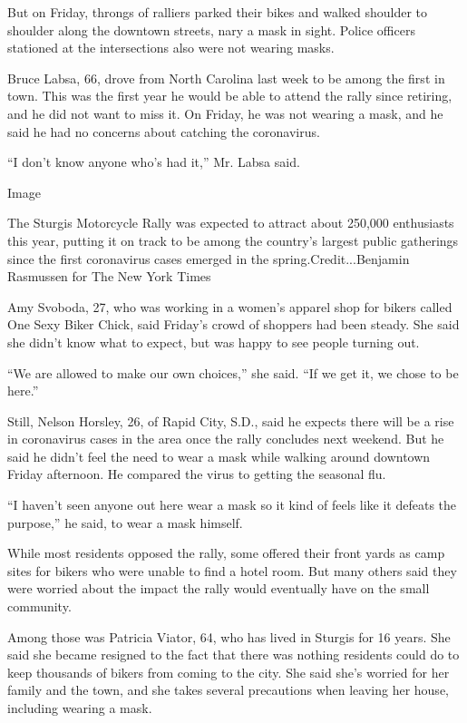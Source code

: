 But on Friday, throngs of ralliers parked their bikes and walked
shoulder to shoulder along the downtown streets, nary a mask in sight.
Police officers stationed at the intersections also were not wearing
masks.

Bruce Labsa, 66, drove from North Carolina last week to be among the
first in town. This was the first year he would be able to attend the
rally since retiring, and he did not want to miss it. On Friday, he was
not wearing a mask, and he said he had no concerns about catching the
coronavirus.

``I don't know anyone who's had it,'' Mr. Labsa said.

Image

The Sturgis Motorcycle Rally was expected to attract about 250,000
enthusiasts this year, putting it on track to be among the country's
largest public gatherings since the first coronavirus cases emerged in
the spring.Credit...Benjamin Rasmussen for The New York Times

Amy Svoboda, 27, who was working in a women's apparel shop for bikers
called One Sexy Biker Chick, said Friday's crowd of shoppers had been
steady. She said she didn't know what to expect, but was happy to see
people turning out.

``We are allowed to make our own choices,'' she said. ``If we get it, we
chose to be here.''

Still, Nelson Horsley, 26, of Rapid City, S.D., said he expects there
will be a rise in coronavirus cases in the area once the rally concludes
next weekend. But he said he didn't feel the need to wear a mask while
walking around downtown Friday afternoon. He compared the virus to
getting the seasonal flu.

``I haven't seen anyone out here wear a mask so it kind of feels like it
defeats the purpose,'' he said, to wear a mask himself.

While most residents opposed the rally, some offered their front yards
as camp sites for bikers who were unable to find a hotel room. But many
others said they were worried about the impact the rally would
eventually have on the small community.

Among those was Patricia Viator, 64, who has lived in Sturgis for 16
years. She said she became resigned to the fact that there was nothing
residents could do to keep thousands of bikers from coming to the city.
She said she's worried for her family and the town, and she takes
several precautions when leaving her house, including wearing a mask.

